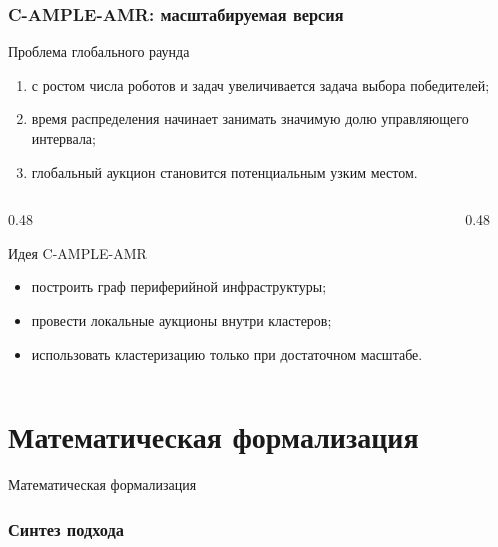 \begin{frame}[shrink=5]
	\frametitle{C-AMPLE-AMR: масштабируемая версия}
	\small
	\begin{block}{Проблема глобального раунда}
		\begin{enumerate}
			\item с ростом числа роботов и задач увеличивается задача выбора победителей;
			\item время распределения начинает занимать значимую долю управляющего интервала;
			\item глобальный аукцион становится потенциальным узким местом.
		\end{enumerate}
	\end{block}
	\begin{columns}[T,onlytextwidth]
		\begin{column}{0.48\textwidth}
			\begin{block}{Идея C-AMPLE-AMR}
				\begin{itemize}
					\item построить граф периферийной инфраструктуры;
					\item провести локальные аукционы внутри кластеров;
					\item использовать кластеризацию только при достаточном масштабе.
				\end{itemize}
			\end{block}
		\end{column}
		\begin{column}{0.48\textwidth}
			\begin{center}
			\end{center}
		\end{column}
	\end{columns}
\end{frame}

\section{Математическая формализация}

\begin{frame}
	\begin{center}
		\Huge Математическая формализация
	\end{center}
\end{frame}

\begin{frame}
	\frametitle{Синтез подхода}
	\begin{center}
	\end{center}
\end{frame}

